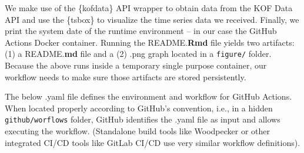 \documentclass[
  12pt,
  letterpaper,
]{krantz}
\begin{document}
We make use of the \{kofdata\} API wrapper to obtain data from the KOF
Data API and use the \{tsbox\} to visualize the time
series data we received. Finally, we print the system
date of the runtime environment -- in our case the GitHub Actions
Docker container. Running the README.\textbf{Rmd} file
yields two artifacts: (1) a README.\textbf{md} file and a (2) .png graph
located in a \texttt{figure/} folder. Because the above runs inside a
temporary single purpose container, our workflow needs to make sure
those artifacts are stored persistently.

The below .yaml file defines the environment and workflow for GitHub
Actions. When located properly according to GitHub's
convention, i.e., in a hidden \texttt{github/worflows} folder, GitHub
identifies the .yaml file as input and allows executing the workflow.
(Standalone build tools like Woodpecker or other
integrated CI/CD tools like GitLab
CI/CD use very similar workflow definitions).
\end{document}
